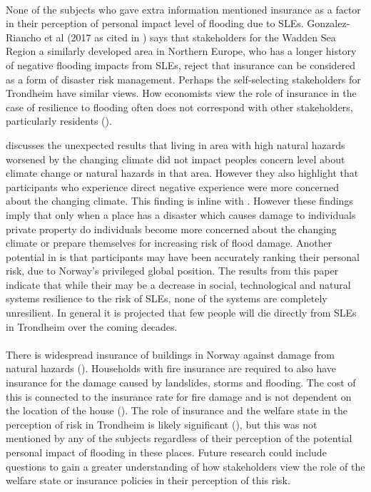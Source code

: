\paragraph{}
None of the subjects who gave extra information mentioned insurance as a factor in their perception of personal impact level of flooding due to SLEs. Gonzalez-Riancho et al (2017 as cited in \cite{gerkensmeier_governing_2018}) says that stakeholders for the Wadden Sea Region a similarly developed area in Northern Europe, who has a longer history of negative flooding impacts from SLEs, reject that insurance can be considered as a form of disaster risk management. Perhaps the self-selecting stakeholders for Trondheim have similar views. How economists view the role of insurance in the case of resilience to flooding often does not correspond with other stakeholders, particularly residents (\cite{gerkensmeier_governing_2018}).


\cite{lujala_climate_2015} discusses the unexpected results that living in area with high natural hazards worsened by the changing climate did not impact peoples concern level about climate change or natural hazards in that area. However they also highlight that participants who experience direct negative experience were more concerned about the changing climate. This finding is inline with \cite{whitmarsh_are_2008}. However these findings imply that only when a place has a disaster which causes damage to individuals private property do individuals become more concerned about the changing climate or prepare themselves for increasing risk of flood damage. Another potential in \cite{lujala_climate_2015} is that participants may have been accurately ranking their personal risk, due to Norway's privileged global position. The results from this paper indicate that while their may be a decrease in social, technological and natural systems resilience to the risk of SLEs, none of the systems are completely unresilient. In general it is projected that few people will die directly from SLEs in Trondheim over the coming decades.
\paragraph{}


There is widespread insurance of buildings in Norway against damage from natural hazards (\cite{lujala_role_2020}). Households with fire insurance are required to also have insurance for the damage caused by landslides, storms and flooding. The cost of this is connected to the insurance rate for fire damage and is not dependent on the location of the house (\cite{lujala_role_2020}). The role of insurance and the welfare state in the perception of risk in Trondheim is likely significant (\cite{lujala_role_2020}), but this was not mentioned by any of the subjects regardless of their perception of the potential personal impact of flooding in these places. Future research could include questions to gain a greater understanding of how stakeholders view the role of the welfare state or insurance policies in their perception of this risk. 

